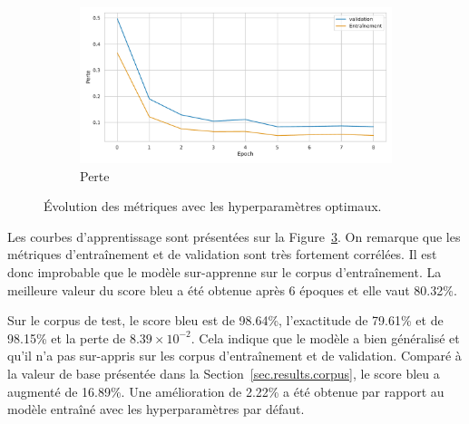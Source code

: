 \begin{figure}[!hbt]
\begin{subfigure}{.5\textwidth}
\begin{center}
        \end{center}
        \label{fig.results.tuned.training.bleu}
    \end{subfigure}
    \begin{subfigure}{.5\textwidth}
        \begin{center}
            \includegraphics[width=\textwidth]{assets/python/tuned-loss.pdf}
        \end{center}
        \caption{Perte}
        \label{fig.results.tuned.training.loss}
    \end{subfigure}
    \caption{Évolution des métriques avec les hyperparamètres optimaux.}
    \label{fig.results.tuned.training}
\end{figure}

Les courbes d'apprentissage sont présentées sur la Figure~\ref{fig.results.tuned.training}.
On remarque que les métriques d'entraînement et de validation sont très fortement corrélées.
Il est donc improbable que le modèle sur-apprenne sur le corpus d'entraînement.
La meilleure valeur du score \gls{bleu} a été obtenue après 6 époques et elle vaut 80.32\%.

Sur le corpus de test, le score \gls{bleu} est de 98.64\%, 
l'exactitude de 79.61\% et de 98.15\% et la perte de \(8.39\times 10^{-2}\).
Cela indique que le modèle a bien généralisé et qu'il n'a pas sur-appris sur les corpus d'entraînement et de validation.
Comparé à la valeur de base présentée dans la Section~\ref{sec.results.corpus},
le score \gls{bleu} a augmenté de 16.89\%.
Une amélioration de 2.22\% a été obtenue par rapport au modèle entraîné avec les hyperparamètres par défaut.

